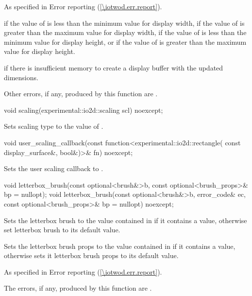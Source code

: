 \begin{itemdescr}
\pnum
\throws
As specified in Error reporting (\ref{\iotwod.err.report}).

\pnum
\errors
{} if the value of  is less than the minimum value for display width, if the value of  is greater than the maximum value for display width, if the value of  is less than the minimum value for display height, or if the value of  is greater than the maximum value for display height.

 if there is insufficient memory to create a display buffer with the updated dimensions.

Other errors, if any, produced by this function are .
\end{itemdescr}

\begin{itemdecl}
void scaling(experimental::io2d::scaling scl) noexcept;
\end{itemdecl}
\begin{itemdescr}
\pnum
\effects
Sets scaling type to the value of .
\end{itemdescr}

\begin{itemdecl}
void user_scaling_callback(const function<experimental::io2d::rectangle(
  const display_surface&, bool&)>& fn) noexcept;
\end{itemdecl}
\begin{itemdescr}
\pnum
\effects
Sets the user scaling callback to .
\end{itemdescr}

\begin{itemdecl}
void letterbox_brush(const optional<brush&>b,
  const optional<brush_props>& bp = nullopt);
void letterbox_brush(const optional<brush&>b, error_code& ec,
  const optional<brush_props>& bp = nullopt) noexcept;
\end{itemdecl}
\begin{itemdescr}
\pnum
\effects
Sets the letterbox brush to the value contained in  if it contains a value, otherwise set letterbox brush to its default value.

\pnum
Sets the letterbox brush props to the value contained in  if it contains a value, otherwise sets it letterbox brush props to its default value.

\pnum
\throws
As specified in Error reporting (\ref{\iotwod.err.report}).

\pnum
\errors
The errors, if any, produced by this function are .
\end{itemdescr}


